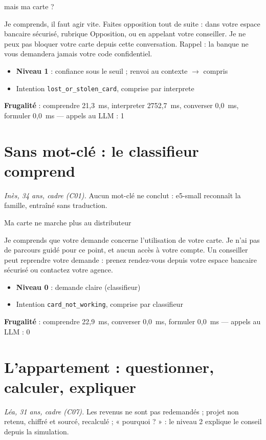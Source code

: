 \documentclass[11pt,a4paper]{article}
\newcommand{\frugal}[1]{{\scriptsize\color{darkgray}\textbf{Frugalité} : #1}\par\medskip}
\begin{document}
\begin{client}mais ma carte ?\end{client}
\begin{assistant}Je comprends, il faut agir vite. Faites opposition tout de suite : dans votre espace bancaire sécurisé, rubrique Opposition, ou en appelant votre conseiller. Je ne peux pas bloquer votre carte depuis cette conversation. Rappel : la banque ne vous demandera jamais votre code confidentiel.\end{assistant}
\begin{pourquoi}
\begin{itemize}
\item \textbf{Niveau 1} : confiance sous le seuil ; renvoi au contexte $\rightarrow$ compris
\item Intention \texttt{lost\_or\_stolen\_card}, comprise par interprete
\end{itemize}
\end{pourquoi}
\frugal{comprendre 21,3~ms, interpreter 2752,7~ms, converser 0,0~ms, formuler 0,0~ms --- appels au LLM : 1}

\section{Sans mot-clé : le classifieur comprend}
\textit{Inès, 34 ans, cadre (C01).} Aucun mot-clé ne conclut : e5-small reconnaît la famille, entraîné sans traduction.

\begin{client}Ma carte ne marche plus au distributeur\end{client}
\begin{assistant}Je comprends que votre demande concerne l'utilisation de votre carte. Je n'ai pas de parcours guidé pour ce point, et aucun accès à votre compte. Un conseiller peut reprendre votre demande : prenez rendez-vous depuis votre espace bancaire sécurisé ou contactez votre agence.\end{assistant}
\begin{pourquoi}
\begin{itemize}
\item \textbf{Niveau 0} : demande claire (classifieur)
\item Intention \texttt{card\_not\_working}, comprise par classifieur
\end{itemize}
\end{pourquoi}
\frugal{comprendre 22,9~ms, converser 0,0~ms, formuler 0,0~ms --- appels au LLM : 0}

\section{L'appartement : questionner, calculer, expliquer}
\textit{Léa, 31 ans, cadre (C07).} Les revenus ne sont pas redemandés ; projet non retenu, chiffré et sourcé, recalculé ; « pourquoi ? » : le niveau 2 explique le conseil depuis la simulation.
\end{document}
